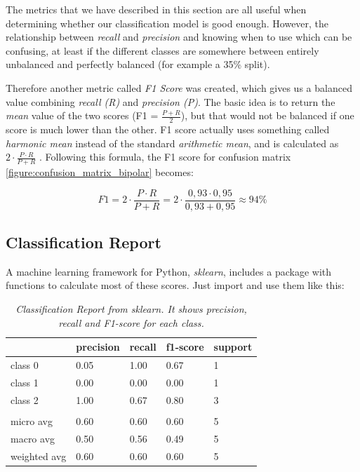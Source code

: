 The metrics that we have described in this section are all useful when determining whether our classification model is good enough. However, the relationship between \textit{recall} and \textit{precision} and knowing when to use which can be confusing, at least if the different classes are somewhere between entirely unbalanced and perfectly balanced (for example a 35\% split). 

Therefore another metric called \textit{F1 Score} was created, which gives us a balanced value combining \textit{recall (R)} and \textit{precision (P)}. The basic idea is to return the \textit{mean} value of the two scores (F1 = $ \frac{P + R}{2} $), but that would not be balanced if one score is much lower than the other. F1 score actually uses something called \textit{harmonic mean} instead of the standard \textit{arithmetic mean}, and is calculated as $ 2 \cdot \frac{P \cdot R}{P + R} $ \cite{ml_metrics}. 
Following this formula, the F1 score for confusion matrix \ref{figure:confusion_matrix_bipolar} becomes:

\[
  F1 = 2 \cdot \frac{P \cdot R}{P + R} = 2 \cdot \frac{0,93 \cdot 0,95}{0,93 + 0,95} \approx 94\%
\]

\subsection{Classification Report}

A machine learning framework for Python, \textit{sklearn}, includes a package with functions to calculate most of these scores. Just import and use them like this: 



\begin{table}[h]
\begin{center}
  \begin{tabular}{| l | l | l | l | l |}
    \hline
                  & precision & recall  & f1-score & support \\ \hline
    class 0       & 0.05      & 1.00    & 0.67     & 1       \\
    class 1       & 0.00      & 0.00    & 0.00     & 1       \\
    class 2       & 1.00      & 0.67    & 0.80     & 3       \\
                  &           &         &          &         \\ 
    micro avg     & 0.60      & 0.60    & 0.60     & 5       \\
    macro avg     & 0.50      & 0.56    & 0.49     & 5       \\
    weighted avg  & 0.60      & 0.60    & 0.60     & 5       \\
    \hline
  \end{tabular}
  \caption{\textit{Classification Report from sklearn. It shows precision, recall and F1-score for each class.}}
  \label{table:classification_report}
\end{center}
\end{table}

